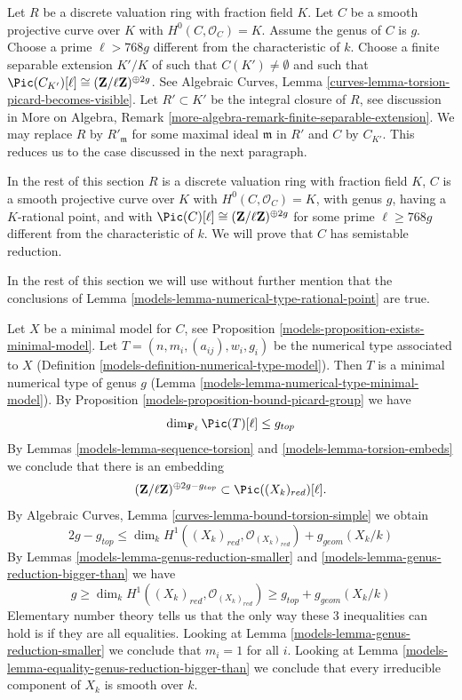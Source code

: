 \medskip\noindent
Let $R$ be a discrete valuation ring with fraction field $K$.
Let $C$ be a smooth projective curve over $K$ with $H^0(C, \mathcal{O}_C) = K$.
Assume the genus of $C$ is $g$.
Choose a prime $\ell > 768g$ different from the characteristic of $k$.
Choose a finite separable extension $K'/K$ of
such that $C(K') \not = \emptyset$ and such that
$\Pic(C_{K'})[\ell] \cong (\mathbf{Z}/\ell \mathbf{Z})^{\oplus 2g}$.
See
Algebraic Curves, Lemma \ref{curves-lemma-torsion-picard-becomes-visible}.
Let $R' \subset K'$ be the integral closure of $R$, see
discussion in More on Algebra, Remark
\ref{more-algebra-remark-finite-separable-extension}.
We may replace $R$ by $R'_{\mathfrak m}$ for some maximal ideal
$\mathfrak m$ in $R'$ and $C$ by $C_{K'}$. This
reduces us to the case discussed in the next paragraph.

\medskip\noindent
In the rest of this section
$R$ is a discrete valuation ring with fraction field $K$,
$C$ is a smooth projective curve over $K$ with $H^0(C, \mathcal{O}_C) = K$,
with genus $g$, having a $K$-rational point, and with
$\Pic(C)[\ell] \cong (\mathbf{Z}/\ell \mathbf{Z})^{\oplus 2g}$
for some prime $\ell \geq 768g$ different from the characteristic of $k$.
We will prove that $C$ has semistable reduction.

\medskip\noindent
In the rest of this section we will use without further mention
that the conclusions of Lemma \ref{models-lemma-numerical-type-rational-point}
are true.

\medskip\noindent
Let $X$ be a minimal model for $C$, see
Proposition \ref{models-proposition-exists-minimal-model}.
Let $T = (n, m_i, (a_{ij}), w_i, g_i)$
be the numerical type associated to $X$
(Definition \ref{models-definition-numerical-type-model}).
Then $T$ is a minimal numerical type of genus $g$
(Lemma \ref{models-lemma-numerical-type-minimal-model}).
By Proposition \ref{models-proposition-bound-picard-group}
we have
$$
\dim_{\mathbf{F}_\ell} \Pic(T)[\ell] \leq g_{top}
$$
By Lemmas \ref{models-lemma-sequence-torsion} and \ref{models-lemma-torsion-embeds}
we conclude that there is an embedding
$$
(\mathbf{Z}/\ell \mathbf{Z})^{\oplus 2g - g_{top}}
\subset \Pic((X_k)_{red})[\ell].
$$
By Algebraic Curves, Lemma \ref{curves-lemma-bound-torsion-simple} we obtain
$$
2g - g_{top} \leq
\dim_k H^1((X_k)_{red}, \mathcal{O}_{(X_k)_{red}}) + g_{geom}(X_k/k)
$$
By Lemmas \ref{models-lemma-genus-reduction-smaller} and
\ref{models-lemma-genus-reduction-bigger-than}
we have
$$
g \geq \dim_k H^1((X_k)_{red}, \mathcal{O}_{(X_k)_{red}}) \geq
g_{top} + g_{geom}(X_k/k)
$$
Elementary number theory tells us that the only way these $3$
inequalities can hold is if they are all equalities.
Looking at Lemma \ref{models-lemma-genus-reduction-smaller}
we conclude that $m_i = 1$ for all $i$.
Looking at Lemma \ref{models-lemma-equality-genus-reduction-bigger-than}
we conclude that every irreducible component of $X_k$
is smooth over $k$.

